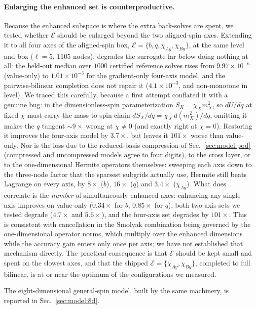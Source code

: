 \documentclass[
  aps,
  prd,
  twocolumn,
  amsmath,
  amssymb,
  nofootinbib,
  superscriptaddress,
  floatfix,
]{revtex4-2}
\begin{document}
\paragraph*{Enlarging the enhanced set is counterproductive.}
Because the enhanced subspace is where the extra back-solves are spent, we tested
whether $\mathcal{E}$ should be enlarged beyond the two aligned-spin axes. Extending it
to all four axes of the aligned-spin box, $\mathcal{E}=\{b,q,\chi_{Ay},\chi_{By}\}$, at
the same level and box ($\ell=5$, $1105$ nodes), degrades the surrogate far below doing
nothing at all: the held-out median over $1000$ certified reference solves rises from
$9.97\times10^{-6}$ (value-only) to $1.01\times10^{-3}$ for the gradient-only four-axis
model, and the pairwise-bilinear completion does not repair it ($4.1\times10^{-3}$, and
non-monotone in level). We traced this carefully, because a first attempt conflated it
with a genuine bug: in the dimensionless-spin parameterization $S_X=\chi_X m_X^2$, so
$dU/dq$ at fixed $\chi$ must carry the mass-to-spin chain
$dS_X/dq=\chi_X\,d(m_X^2)/dq$; omitting it makes the $q$ tangent $\sim\!9\times$ wrong
at $\chi\neq0$ (and exactly right at $\chi=0$). Restoring it improves the four-axis
model by $3.7\times$, but leaves it $101\times$ worse than value-only. Nor is the loss
due to the reduced-basis compression of Sec.~\ref{sec:model:pod} (compressed and
uncompressed models agree to four digits), to the cross layer, or to the
one-dimensional Hermite operators themselves:
sweeping each axis down to the three-node factor that the sparsest subgrids actually
use, Hermite still beats Lagrange on every axis, by $8\times$ ($b$), $16\times$ ($q$)
and $3.4\times$ ($\chi_{Ay}$). What does correlate is the \emph{number} of
simultaneously enhanced axes: enhancing any single axis improves on value-only
($0.34\times$ for $b$, $0.85\times$ for $q$), both two-axis sets we tested degrade
($4.7\times$ and $5.6\times$), and the four-axis set degrades by $101\times$. This is
consistent with cancellation in the Smolyak combination being governed by the
one-dimensional operator norms, which multiply over the enhanced dimensions while the
accuracy gain enters only once per axis; we have not established that mechanism
directly. The practical consequence is that $\mathcal{E}$ should be kept small and
spent on the slowest axes, and that the shipped $\mathcal{E}=\{\chi_{Ay},\chi_{By}\}$,
completed to full bilinear, is at or near the optimum of the configurations we
measured.

The eight-dimensional general-spin model, built by the same machinery, is
reported in Sec.~\ref{sec:model:8d}.
\end{document}

